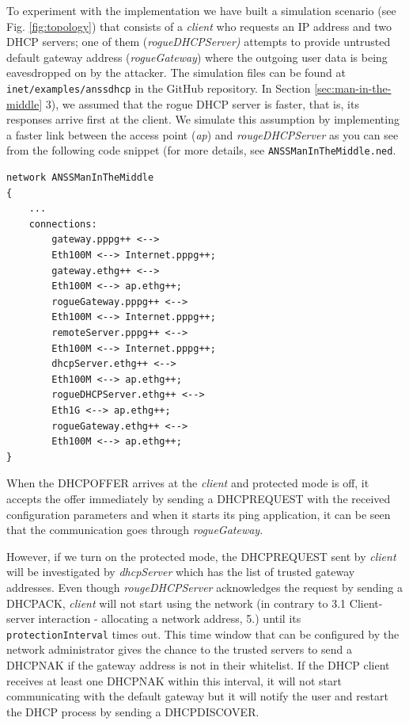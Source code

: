 \documentclass[letterpaper, 10 pt, conference]{ieeeconf}  %
\begin{document}
To experiment with the implementation we have built a simulation scenario (see Fig. \ref{fig:topology}) that consists of a \textit{client} who requests an IP address and two DHCP servers; one of them (\textit{rogueDHCPServer)} attempts to provide untrusted default gateway address (\textit{rogueGateway}) where the outgoing user data is being eavesdropped on by the attacker. The simulation files can be found at \texttt{inet/examples/anssdhcp} in the GitHub repository. In Section \ref{sec:man-in-the-middle} 3), we assumed that the rogue DHCP server is faster, that is, its responses arrive first at the client. We simulate this assumption by implementing a faster link between the access point (\textit{ap}) and \textit{rougeDHCPServer} as you can see from the following code snippet (for more details, see \texttt{ANSSManInTheMiddle.ned}.
\begin{verbatim}
network ANSSManInTheMiddle
{
	...
    connections:
        gateway.pppg++ <--> 
        Eth100M <--> Internet.pppg++;
        gateway.ethg++ <--> 
        Eth100M <--> ap.ethg++;
        rogueGateway.pppg++ <--> 
        Eth100M <--> Internet.pppg++;
        remoteServer.pppg++ <--> 
        Eth100M <--> Internet.pppg++;
        dhcpServer.ethg++ <--> 
        Eth100M <--> ap.ethg++;
        rogueDHCPServer.ethg++ <--> 
        Eth1G <--> ap.ethg++;
        rogueGateway.ethg++ <--> 
        Eth100M <--> ap.ethg++;
}
\end{verbatim}
When the DHCPOFFER arrives at the \textit{client} and protected mode is off, it accepts the offer immediately by sending a DHCPREQUEST with the received configuration parameters and when it starts its ping application, it can be seen that the communication goes through \textit{rogueGateway}.

However, if we turn on the protected mode, the DHCPREQUEST sent by \textit{client} will be investigated by \textit{dhcpServer} which has the list of trusted gateway addresses. Even though \textit{rougeDHCPServer} acknowledges the request by sending a DHCPACK, \textit{client} will not start using the network (in contrary to \cite{dhcprfc} 3.1 Client-server interaction - allocating a network address, 5.) until its \texttt{protectionInterval} times out. This time window that can be configured by the network administrator gives the chance to the trusted servers to send a DHCPNAK if the gateway address is not in their whitelist. If the DHCP client receives at least one DHCPNAK within this interval, it will not start communicating with the default gateway but it will notify the user and restart the DHCP process by sending a DHCPDISCOVER.
\end{document}
